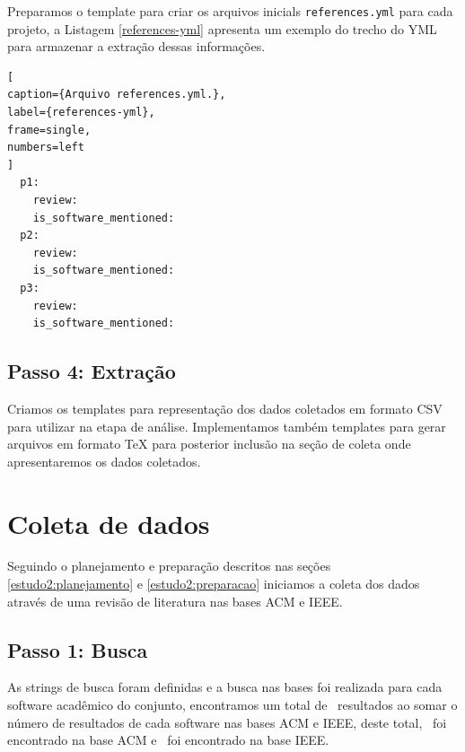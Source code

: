 Preparamos o template para criar os arquivos inicials \texttt{references.yml}
para cada projeto, a Listagem \ref{references-yml} apresenta um exemplo do
trecho do YML para armazenar a extração dessas informações.

\begin{lstlisting}[
caption={Arquivo references.yml.},
label={references-yml},
frame=single,
numbers=left
]
  p1:
    review:
    is_software_mentioned:
  p2:
    review:
    is_software_mentioned:
  p3:
    review:
    is_software_mentioned:
\end{lstlisting}

\subsection{Passo 4: Extração}

Criamos os templates para representação dos dados coletados em formato CSV
para utilizar na etapa de análise. Implementamos também templates para gerar arquivos em
formato TeX para posterior inclusão na seção de coleta onde apresentaremos os dados
coletados.



\section{Coleta de dados} \label{estudo2:coleta} %

Seguindo o planejamento e preparação descritos nas seções
\ref{estudo2:planejamento} e \ref{estudo2:preparacao} iniciamos a coleta dos
dados através de uma revisão de literatura nas bases ACM e IEEE.



\subsection{Passo 1: Busca}

As strings de busca foram definidas e a busca nas bases foi realizada para cada
software acadêmico do conjunto, encontramos um total de \SearchCount \
resultados ao somar o número de resultados de cada software nas bases ACM e
IEEE, deste total, \SearchACMCount \ foi encontrado na base ACM e
\SearchIEEECount \ foi encontrado na base IEEE.

